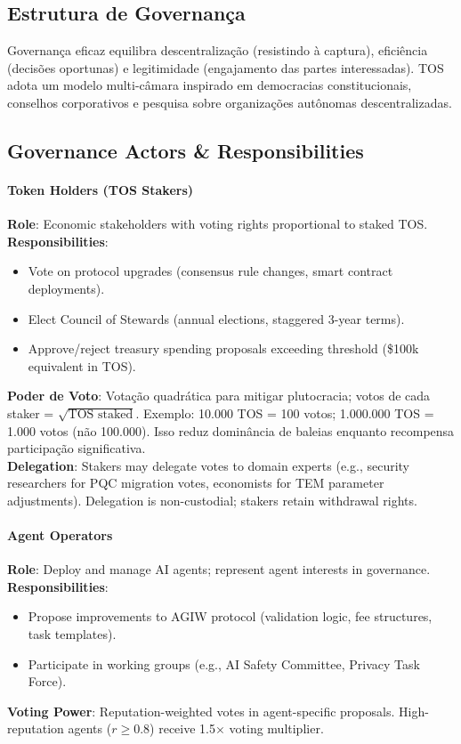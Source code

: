 \documentclass[11pt]{article}
\begin{document}
\begin{itemize}[noitemsep]
\begin{itemize}[noitemsep]
\begin{itemize}[noitemsep]
\section{Estrutura de Governança}
\label{sec:governance}

Governança eficaz equilibra descentralização (resistindo à captura), eficiência (decisões oportunas) e legitimidade (engajamento das partes interessadas). TOS adota um modelo multi-câmara inspirado em democracias constitucionais, conselhos corporativos e pesquisa sobre organizações autônomas descentralizadas.

\subsection{Governance Actors \& Responsibilities}

\paragraph{Token Holders (TOS Stakers)}
\textbf{Role}: Economic stakeholders with voting rights proportional to staked TOS.\\
\textbf{Responsibilities}:
\begin{itemize}[noitemsep]
  \item Vote on protocol upgrades (consensus rule changes, smart contract deployments).
  \item Elect Council of Stewards (annual elections, staggered 3-year terms).
  \item Approve/reject treasury spending proposals exceeding threshold (\$100k equivalent in TOS).
\end{itemize}
\textbf{Poder de Voto}: Votação quadrática para mitigar plutocracia; votos de cada staker = $\sqrt{\text{TOS staked}}$. Exemplo: 10.000 TOS = 100 votos; 1.000.000 TOS = 1.000 votos (não 100.000). Isso reduz dominância de baleias enquanto recompensa participação significativa.\\
\textbf{Delegation}: Stakers may delegate votes to domain experts (e.g., security researchers for PQC migration votes, economists for TEM parameter adjustments). Delegation is non-custodial; stakers retain withdrawal rights.

\paragraph{Agent Operators}
\textbf{Role}: Deploy and manage AI agents; represent agent interests in governance.\\
\textbf{Responsibilities}:
\begin{itemize}[noitemsep]
  \item Propose improvements to AGIW protocol (validation logic, fee structures, task templates).
  \item Participate in working groups (e.g., AI Safety Committee, Privacy Task Force).
\end{itemize}
\textbf{Voting Power}: Reputation-weighted votes in agent-specific proposals. High-reputation agents ($r \geq 0.8$) receive 1.5$\times$ voting multiplier.


\end{itemize}
\end{itemize}
\end{itemize}
\end{document}
